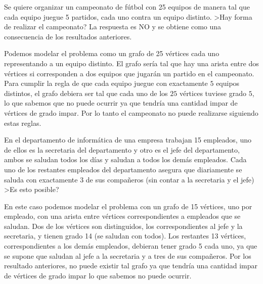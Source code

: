\begin{ejemplo}
Se quiere organizar un campeonato de fútbol con 25 equipos de manera tal que cada equipo juegue 5 partidos, cada uno contra un equipo distinto. 
>Hay forma de realizar el campeonato?
La respuesta es NO y se obtiene como una consecuencia de los resultados anteriores.

Podemos modelar el problema como un grafo de 25 vértices cada uno representando a un equipo distinto.
El grafo sería tal que hay una arista entre dos vértices si corresponden a dos equipos que jugarán un partido en el campeonato.
Para cumplir la regla de que cada equipo juegue con exactamente $5$ equipos distintos, el grafo debiera ser tal que cada uno de los $25$ vértices tuviese grado $5$, lo que sabemos que no puede ocurrir ya que tendría una cantidad impar de vértices de grado impar.
Por lo tanto el campeonato no puede realizarse siguiendo estas reglas.
\end{ejemplo}
  
\begin{ejemplo}
En el departamento de informática de una empresa trabajan 15 empleados, uno de ellos es la secretaria del departamento y otro es el jefe del departamento, ambos se saludan todos los días y saludan a todos los demás empleados.
Cada uno de los restantes empleados del departamento asegura que diariamente se saluda con exactamente 3 de sus compañeros (sin contar a la secretaria y el jefe) 
>Es esto posible? 

En este caso podemos modelar el problema con un grafo de 15 vértices, uno por empleado, con una arista entre vértices correspondientes a empleados que se saludan.
Dos de los vértices son distinguidos, los correspondientes al jefe y la secretaria, y tienen grado 14 (se saludan con todos).
Los restantes 13 vértices, correspondientes a los demás empleados, debieran tener grado 5 cada uno, ya que se supone que saludan al jefe a la secretaria y a tres de sus compañeros.
Por los resultado anteriores, no puede existir tal grafo ya que tendría una cantidad impar de vértices de grado impar lo que sabemos no puede ocurrir.
\end{ejemplo}
